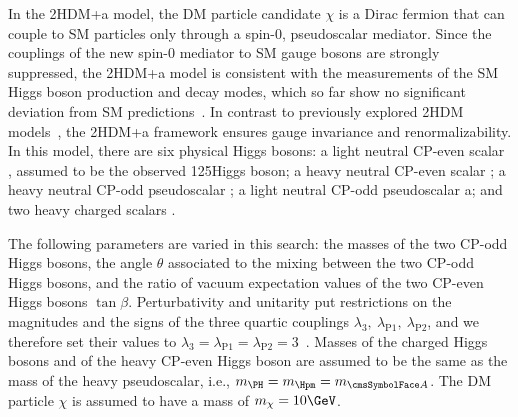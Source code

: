 In the 2HDM+a model, the DM particle candidate $\chi$ is a Dirac fermion that can couple to SM particles only through a spin-0, pseudoscalar mediator. Since the couplings of the new spin-0
mediator to SM gauge bosons are strongly suppressed, the 2HDM+a model
is consistent with the measurements of the SM Higgs boson production and
decay modes, which so far show no significant deviation from SM predictions~\cite{Khachatryan:2016vau}. In contrast to previously explored 2HDM models~\cite{2HDM,Aaboud:2017yqz,Sirunyan:2017hnk}, the 2HDM+a framework ensures gauge invariance and renormalizability. In this model, there are six physical Higgs bosons:
a light neutral CP-even scalar \Ph, assumed to be the
observed 125\GeV Higgs boson; a heavy neutral CP-even scalar \PH;
a heavy neutral CP-odd pseudoscalar \Az; a light neutral CP-odd pseudoscalar a; and two heavy charged scalars \Hpm. 


The following parameters are varied in this search: the masses of the
two CP-odd Higgs bosons, the angle $\theta$ associated to the mixing
between the two CP-odd Higgs bosons, and the ratio of vacuum
expectation values of the two CP-even Higgs bosons $\tan\beta$.
Perturbativity and unitarity put restrictions on the magnitudes and the
signs of the three quartic couplings
$\lambda_3,~\lambda_{\mathrm{P}1},~\lambda_{\mathrm{P}2}$,
and we therefore set their values to $\lambda_3=\lambda_{\mathrm{P}1}=\lambda_{\mathrm{P}2}=3$~\cite{Bauer2017}. Masses of the charged Higgs bosons and of the heavy CP-even Higgs boson are assumed to be the same as the mass of the heavy pseudoscalar, i.e., $m_{\PH}=m_{\Hpm}=m_{\Az}$. The DM particle $\chi$ is assumed to have a mass of $m_\chi=10\GeV$.


